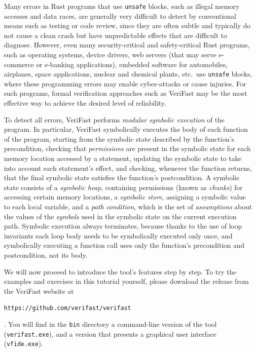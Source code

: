 \documentclass{article}
\begin{document}
Many errors in Rust programs that use \lstinline|unsafe| blocks, such as illegal memory accesses and
data races, are generally very difficult to detect by
conventional means such as testing or code review, since they
are often subtle and typically do not cause a clean crash but
have unpredictable effects that are difficult to diagnose.
However, even many security-critical and safety-critical Rust programs,
such as operating systems, device drivers, web servers (that
may serve e-commerce or e-banking applications), embedded
software for automobiles, airplanes, space applications,
nuclear and chemical plants, etc.\ use \lstinline|unsafe| blocks, where
these programming errors may enable cyber-attacks or cause
injuries. For such programs, formal verification approaches
such as VeriFast may be the most effective way to achieve the
desired level of reliability.

To detect all errors, VeriFast performs \emph{modular symbolic execution}
of the program. In particular, VeriFast symbolically executes the body of
each function of the program, starting from the symbolic state described
by the function's precondition, checking that \emph{permissions} are
present in the symbolic state for each memory location accessed by a
statement, updating the symbolic state to take into account each
statement's effect, and checking, whenever the function returns, that the
final symbolic state satisfies the function's postcondition. A symbolic
state consists of a \emph{symbolic heap}, containing permissions (known as
\emph{chunks}) for accessing certain memory locations, a \emph{symbolic
store}, assigning a symbolic value to each local variable, and a
\emph{path condition}, which is the set of \emph{assumptions} about the
values of the \emph{symbols} used in the symbolic state on the current
execution path. Symbolic execution always terminates, because thanks to
the use of loop invariants each loop body needs to be symbolically
executed only once, and symbolically executing a function call uses only
the function's precondition and postcondition, not its body.

We will now proceed to introduce the tool's features step by
step. To try the examples and exercises in this tutorial
yourself, please download the release from the VeriFast website
at
\begin{center}
\texttt{https://github.com/verifast/verifast}
\end{center}
. You will find in the \texttt{bin} directory a command-line version of
the tool (\texttt{verifast.exe}), and a version that presents a graphical
user interface (\texttt{vfide.exe}).
\end{document}
